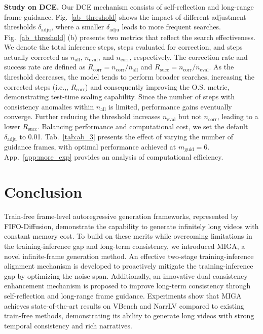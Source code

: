 \documentclass{llmxive}
\providecommand{\ie}{i.e.,\xspace}
\begin{document}
\textbf{Study on DCE.}
Our DCE mechanism consists of self-reflection and long-range frame guidance. 
Fig.~\ref{ab_threshold} shows the impact of different adjustment thresholds $\delta_{\mathrm{adju}}$, where a smaller $\delta_{\mathrm{adju}}$ leads to more frequent searches. 
Fig.~\ref{ab_threshold} (b) presents two metrics that reflect the search effectiveness. We denote the total inference steps, steps evaluated for correction, and steps actually corrected as $n_{\mathrm{all}}$, $n_{\mathrm{eval}}$, and $n_{\mathrm{corr}}$, respectively. The correction rate and success rate are defined as $R_{\mathrm{corr}} = n_{\mathrm{corr}} / n_{\mathrm{all}}$ and $R_{\mathrm{succ}} = n_{\mathrm{corr}} / n_{\mathrm{eval}}$.
As the threshold decreases, the model tends to perform broader searches, increasing the corrected steps (\ie, $R_{\mathrm{corr}}$) and consequently improving the O.S. metric, demonstrating test-time scaling capability.
Since the number of steps with consistency anomalies within $n_{\mathrm{all}}$ is limited, performance gains eventually converge. Further reducing the threshold increases $n_{\mathrm{eval}}$ but not $n_{\mathrm{corr}}$, leading to a lower $R_{\mathrm{succ}}$.
Balancing performance and computational cost, we set the default $\delta_{\mathrm{adju}}$ to 0.01.
Tab.~\ref{tab:ab_3} presents the effect of varying the number of guidance frames, with optimal performance achieved at $m_{\mathrm{guid}}=6$.
App.~\ref{app:more_exp} provides an analysis of computational efficiency.

\section{Conclusion}
Train-free frame-level autoregressive generation frameworks, represented by FIFO-Diffusion, demonstrate the capability to generate infinitely long videos with constant memory cost.
To build on these merits while overcoming limitations in the training-inference gap and long-term consistency, we introduced MIGA, a novel infinite-frame generation method. 
An effective two-stage training-inference alignment mechanism is developed to proactively mitigate the training-inference gap by optimizing the noise span. 
Additionally, an innovative dual consistency enhancement mechanism is proposed to improve long-term consistency through self-reflection and long-range frame guidance.
Experiments show that MIGA achieves state-of-the-art results on VBench and NarrLV compared to existing train-free methods, demonstrating its ability to generate long videos with strong temporal consistency and rich narratives.
\end{document}

